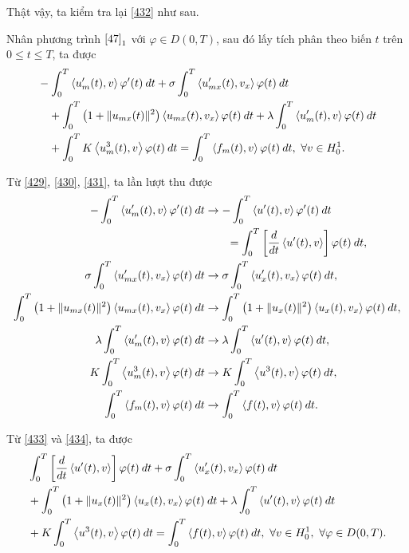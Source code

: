 \documentclass[12pt,a4paper]{article}
\theoremstyle{definition}
\theoremstyle{definition}
\begin{document}
Thật vậy, ta kiểm tra lại \eqref{432} như sau.

Nhân phương trình $\eqref{47}_1$ với $\varphi \in D(0,T)$, sau đó lấy tích phân theo biến $t$ trên $0 \le t \le T$, ta được
\begin{align} \label{433}
    &-\int_0^T \left<u'_m(t),v\right> \varphi'(t)\:dt
    + \sigma \int_0^T \left<u'_{mx}(t),v_x\right> \varphi(t)\:dt \\
    &\quad+ \int_0^T \left(1 + \|u_{mx}(t)\|^2\right)\left<u_{mx}(t),v_x\right> \varphi(t)\:dt
    + \lambda \int_0^T \left<u'_m(t),v\right> \varphi(t)\:dt \notag \\
    &\quad+ \int_0^T K\left<u^3_m(t),v\right> \varphi(t)\:dt = \int_0^T \left<f_m(t),v\right> \varphi(t)\:dt,\ \forall v \in H^1_0. \notag
\end{align}

Từ \eqref{429}, \eqref{430}, \eqref{431}, ta lần lượt thu được
\begin{align} \label{434}
    -\int_0^T \left<u'_m(t),v\right> \varphi'(t)\:dt
    &\to -\int_0^T \left<u'(t),v\right> \varphi'(t)\:dt \\
    &\quad\quad= \int_0^T \left[\frac{d}{dt}\left<u'(t),v\right>\right] \varphi(t)\:dt, \notag \\
    \sigma \int_0^T \left<u'_{mx}(t),v_x\right> \varphi(t)\:dt
    &\to \sigma \int_0^T \left<u'_{x}(t),v_x\right> \varphi(t)\:dt, \notag \\
    \int_0^T \left(1 + \|u_{mx}(t)\|^2\right)\left<u_{mx}(t),v_x\right> \varphi(t)\:dt
    &\to \int_0^T \left(1 + \|u_{x}(t)\|^2\right)\left<u_{x}(t),v_x\right> \varphi(t)\:dt, \notag \\
    \lambda \int_0^T \left<u'_m(t),v\right> \varphi(t)\:dt
    &\to \lambda \int_0^T \left<u'(t),v\right> \varphi(t)\:dt, \notag \\
    K \int_0^T \left<u^3_m(t),v\right> \varphi(t)\:dt &\to K \int_0^T \left<u^3(t),v\right> \varphi(t)\:dt, \notag \\
    \int_0^T \left<f_m(t),v\right> \varphi(t)\:dt &\to \int_0^T \left<f(t),v\right> \varphi(t)\:dt. \notag
\end{align}

Từ \eqref{433} và \eqref{434}, ta được
\begin{align}
    &\int_0^T \left[\frac{d}{dt}\left<u'(t),v\right>\right] \varphi(t)\:dt
    + \sigma \int_0^T \left<u'_{x}(t),v_x\right> \varphi(t)\:dt \\
    &+ \int_0^T \left(1 + \|u_{x}(t)\|^2\right)\left<u_{x}(t),v_x\right> \varphi(t)\:dt
    + \lambda \int_0^T \left<u'(t),v\right> \varphi(t)\:dt \notag \\
    &+ K\int_0^T \left<u^3(t),v\right> \varphi(t)\:dt
    = \int_0^T \left<f(t),v\right> \varphi(t)\:dt,\ \forall v \in H^1_0,\ \forall \varphi \in D(0,T). \notag
\end{align}
\end{document}
